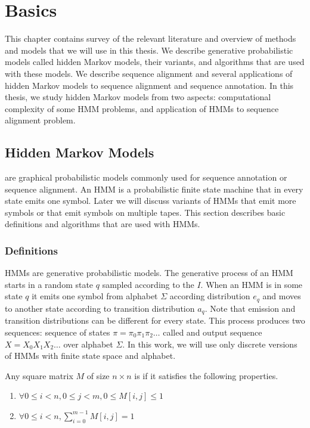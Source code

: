\chapter{Basics}
\label{CHAPTER:BASICS}

This chapter contains survey of the relevant literature and overview of methods
and models that we will use in this thesis. We describe generative
probabilistic models called hidden Markov models, their variants, and
algorithms that are used with these models. We describe sequence
alignment and several applications of hidden Markov models to sequence
alignment and sequence annotation. In this thesis, we study hidden Markov
models from two aspects: computational complexity of some HMM problems, and
application of HMMs to sequence alignment problem.

\section{Hidden Markov Models}
 are graphical probabilistic models
commonly used for sequence annotation or sequence alignment. An HMM is a
probabilistic finite state machine that in every state emits one symbol. Later
we will discuss variants of HMMs that emit more symbols or that emit
symbols on multiple tapes. This section describes basic definitions
and algorithms that are used with HMMs.

\subsection{Definitions}\label{SECTION:HMMDEF}
                       
HMMs are generative probabilistic models.
The generative process of an HMM starts in a random state $q$ sampled according
to the  $I$.  When an HMM is in some state $q$ it emits one symbol from
alphabet $\Sigma$ according distribution $e_q$ and moves to another state
according to transition distribution $a_q$. Note that emission and transition
distributions can be different for every state.  This process produces two
sequences: sequence of states $\pi=\pi_0\pi_1\pi_2\dots$ called
 and output sequence $X=X_0X_1X_2\dots$ over alphabet
$\Sigma$. In this work, we will use only discrete versions of HMMs with finite state
space and alphabet.  


\begin{definition}
Any square matrix $M$ of size $n\times n$ is  if it satisfies the
following properties.
\begin{enumerate}[itemsep=-1mm]
\item $\forall 0\leq i<n,0\leq j < m, 0\leq M[i,j]\leq 1$
\item $\forall 0\le i<n, \sum_{i=0}^{m-1}M[i,j]=1$
\end{enumerate}
\end{definition}

